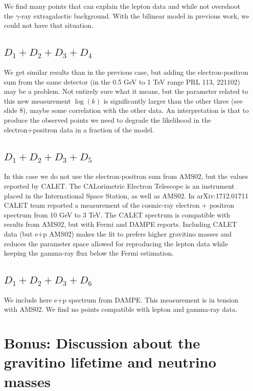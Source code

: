\documentclass[a4paper,11pt]{article}
\begin{document}
We find many points that can explain the lepton data and while not overshoot the $\gamma$-ray extragalactic background. With the bilinear model in previous work, we could not have that situation.

\subsection{$D_1 + D_2 + D_3 + D_4$}

We get similar results than in the previous case, but adding the electron-positron sum from the same detector (in the 0.5 GeV to 1 TeV range PRL 113, 221102) may be a problem. Not entirely sure what it means, but the parameter related to this new measurement $\log(k)$ is significantly larger than the other three (see slide 8), maybe some correlation with the other data. An interpretation is that to produce the observed points we need to degrade the likelihood in the electron+positron data in a fraction of the model.

\subsection{$D_1 + D_2 + D_3 + D_5$}

In this case we do not use the electron-positron sum from AMS02, but the values reported by CALET. The CALorimetric Electron Telescope is an instrument placed in the International Space Station, as well as AMS02. In arXiv:1712.01711 CALET team reported a measurement of the cosmic-ray electron + positron spectrum from 10 GeV to 3 TeV. The CALET spectrum is compatible with results from AMS02, but with Fermi and DAMPE reports. Including CALET data (but e+p AMS02) makes the fit to prefers higher gravitino masses and reduces the parameter space allowed for reproducing the lepton data while keeping the gamma-ray flux below the Fermi estimation.

\subsection{$D_1 + D_2 + D_3 + D_6$}
We include here e+p spectrum from DAMPE. This measurement is in tension with AMS02. We find no points compatible with lepton and gamma-ray data.



\section{Bonus: Discussion about the gravitino lifetime and neutrino masses}
\label{sec:lifetime-neutrinomasses}
\end{document}
